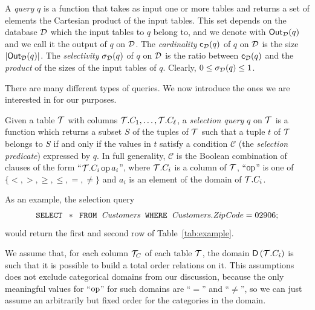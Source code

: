 A \emph{query} $q$ is a function that takes as input one or more tables and
returns a set of elements the Cartesian product of the input tables. This set
depends on the database ${\cal D}$ which the input tables to $q$ belong to, and we
denote with $\mathsf{Out}_{\cal D}(q)$ and we call it the output of $q$ on ${\cal D}$. The
\emph{cardinality} $\mathsf{c}_{\cal D}(q)$ of $q$ on ${\cal D}$ is the size
$|\mathsf{Out}_{\cal D}(q)|$. The \emph{selectivity} $\sigma_{\cal D}(q)$ of $q$ on ${\cal D}$ is
the ratio between $\mathsf{c}_{\cal D}(q)$ and the \emph{product} of the sizes of the
input tables of $q$.  Clearly, $0\le\sigma_{\cal D}(q)\le 1$.

There are many different types of queries. We now introduce the ones we are interested
in for our purposes.
\begin{definition}\label{def:selectquery}
  Given a table ${\cal T}$ with columns ${\cal T}.C_1,\dotsc,{\cal T}.C_\ell$, a
  \emph{selection query} $q$ on ${\cal T}$ is a function which returns a subset
  $S$ of the tuples of ${\cal T}$ such that a tuple $t$ of ${\cal T}$ belongs to $S$ if
  and only if the values in $t$ satisfy a condition $\mathcal{C}$
  (the \emph{selection predicate}) expressed by $q$. In full
  generality, $\mathcal{C}$ is the Boolean combination of clauses of the form
  ``${\cal T}.C_i \operatorname{op} a_i$'', where ${\cal T}.C_i$ is a column of ${\cal T}$, ``$\operatorname{op}$'' is one
  of $\{<,>,\ge,\le,=,\neq\}$ and $a_i$ is an element of the domain of
  ${\cal T}.C_i$.
\end{definition}

As an example, the selection query 
\[
\text{\texttt{SELECT }} * \text{\texttt{ FROM }} \text{\emph{Customers}} \text{\texttt{ WHERE }} \text{\emph{Customers.ZipCode}} = 02906;
\]
would return the first and second row of Table~\ref{tab:example}.

We assume that, for each column ${\cal T}_C$ of each table ${\cal T}$, the domain
$\mathsf{D}\left({\cal T}.C_i\right)$ is such that it is possible to build a total order relations
on it. This assumptions does not exclude categorical domains from our
discussion, because the only meaningful values for ``$\operatorname{op}$'' for such domains
are ``$=$'' and ``$\neq$'', so we can just assume an arbitrarily but fixed order
for the categories in the domain.

